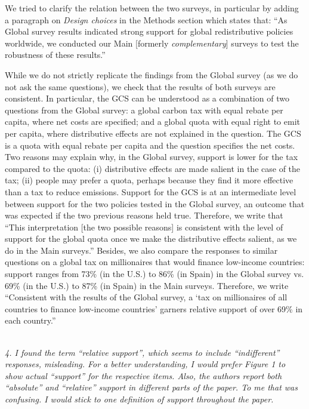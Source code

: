 \documentclass[12pt,english]{article}
\begin{document}
We tried to clarify the relation between the two surveys, in particular by adding a paragraph on \textit{Design choices} in the Methods section which states that: ``As Global survey results indicated strong support for global redistributive policies worldwide, we conducted our Main [formerly \textit{complementary}] surveys to test the robustness of these results.'' 

While we do not strictly replicate the findings from the Global survey (as we do not ask the same questions), we check that the results of both surveys are consistent. In particular, the GCS can be understood as a combination of two questions from the Global survey: a global carbon tax with equal rebate per capita, where net costs are specified; and a global quota with equal right to emit per capita, where distributive effects are not explained in the question. The GCS is a quota with equal rebate per capita and the question specifies the net costs. Two reasons may explain why, in the Global survey, support is lower for the tax compared to the quota: (i) distributive effects are made salient in the case of the tax; (ii) people may prefer a quota, perhaps because they find it more effective than a tax to reduce emissions. Support for the GCS is at an intermediate level between support for the two policies tested in the Global survey, an outcome that was expected if the two previous reasons held true. Therefore, we write that ``This interpretation [the two possible reasons] is consistent with the level of support for the global quota once we make the distributive effects salient, as we do in the Main surveys.'' Besides, we also compare the responses to similar questions on a global tax on millionaires that would finance low-income countries: support ranges from 73\% (in the U.S.) to 86\% (in Spain) in the Global survey vs. 69\% (in the U.S.) to 87\% (in Spain) in the Main surveys. Therefore, we write ``Consistent with the results of the Global survey, a `tax on millionaires of all countries to finance low-income countries' garners relative support of over 69\% in each country.''

~\\

\textit{4. I found the term “relative support”, which seems to include “indifferent” responses, misleading. For a better understanding, I would prefer Figure 1 to show actual “support” for the respective items. Also, the authors report both “absolute” and “relative” support in different parts of the paper. To me that was confusing. I would stick to one definition of support throughout the paper.}
\end{document}
